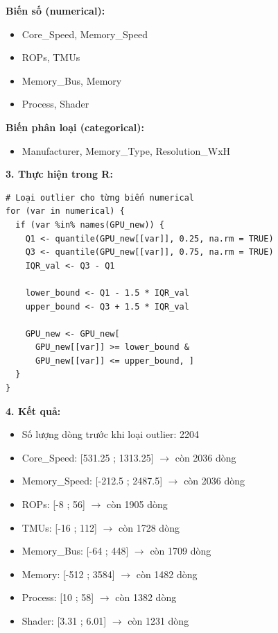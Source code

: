\textbf{Biến số (numerical):}
\begin{itemize}
    \item Core\_Speed, Memory\_Speed
    \item ROPs, TMUs
    \item Memory\_Bus, Memory
    \item Process, Shader
\end{itemize}

\textbf{Biến phân loại (categorical):}
\begin{itemize}
    \item Manufacturer, Memory\_Type, Resolution\_WxH
\end{itemize}

\vspace{0.8em}

\textbf{3. Thực hiện trong R:}

\begin{verbatim}
# Loại outlier cho từng biến numerical
for (var in numerical) {
  if (var %in% names(GPU_new)) {
    Q1 <- quantile(GPU_new[[var]], 0.25, na.rm = TRUE)
    Q3 <- quantile(GPU_new[[var]], 0.75, na.rm = TRUE)
    IQR_val <- Q3 - Q1
    
    lower_bound <- Q1 - 1.5 * IQR_val
    upper_bound <- Q3 + 1.5 * IQR_val
    
    GPU_new <- GPU_new[
      GPU_new[[var]] >= lower_bound & 
      GPU_new[[var]] <= upper_bound, ]
  }
}
\end{verbatim}

\vspace{0.8em}

\textbf{4. Kết quả:}

\begin{itemize}
    \item Số lượng dòng trước khi loại outlier: 2204
    \item Core\_Speed: [531.25 ; 1313.25] $\rightarrow$ còn 2036 dòng
    \item Memory\_Speed: [-212.5 ; 2487.5] $\rightarrow$ còn 2036 dòng
    \item ROPs: [-8 ; 56] $\rightarrow$ còn 1905 dòng
    \item TMUs: [-16 ; 112] $\rightarrow$ còn 1728 dòng
    \item Memory\_Bus: [-64 ; 448] $\rightarrow$ còn 1709 dòng
    \item Memory: [-512 ; 3584] $\rightarrow$ còn 1482 dòng
    \item Process: [10 ; 58] $\rightarrow$ còn 1382 dòng
    \item Shader: [3.31 ; 6.01] $\rightarrow$ còn 1231 dòng
\end{itemize}

